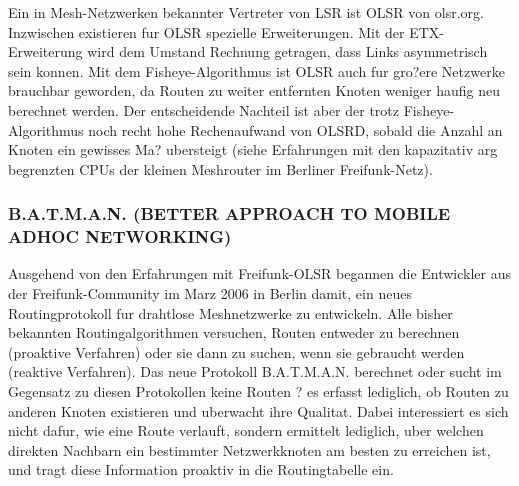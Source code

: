 Ein in Mesh-Netzwerken bekannter Vertreter von LSR ist OLSR von olsr.org. Inzwischen existieren fur OLSR spezielle Erweiterungen. Mit der ETX-Erweiterung wird dem Umstand Rechnung getragen, dass Links asymmetrisch sein konnen. Mit dem Fisheye-Algorithmus ist OLSR auch fur gro?ere Netzwerke brauchbar geworden, da Routen zu weiter entfernten Knoten weniger haufig neu berechnet werden. Der entscheidende Nachteil ist aber der trotz Fisheye-Algorithmus noch recht hohe Rechenaufwand von OLSRD, sobald die Anzahl an Knoten ein gewisses Ma? ubersteigt (siehe Erfahrungen mit den kapazitativ arg begrenzten CPUs der kleinen Meshrouter im Berliner Freifunk-Netz). 

\subsubsection{B.A.T.M.A.N. (BETTER APPROACH TO MOBILE ADHOC NETWORKING)}

Ausgehend von den Erfahrungen mit Freifunk-OLSR begannen die Entwickler aus der Freifunk-Community im Marz 2006 in Berlin damit, ein neues Routingprotokoll fur drahtlose Meshnetzwerke zu entwickeln. Alle bisher bekannten Routingalgorithmen versuchen, Routen entweder zu berechnen (proaktive Verfahren) oder sie dann zu suchen, wenn sie gebraucht werden (reaktive Verfahren). Das neue Protokoll B.A.T.M.A.N. berechnet oder sucht im Gegensatz zu diesen Protokollen keine Routen ? es erfasst lediglich, ob Routen zu anderen Knoten existieren und uberwacht ihre Qualitat. Dabei interessiert es sich nicht dafur, wie eine Route verlauft, sondern ermittelt lediglich, uber welchen direkten Nachbarn ein bestimmter Netzwerkknoten am besten zu erreichen ist, und tragt diese Information proaktiv in die Routingtabelle ein. 

